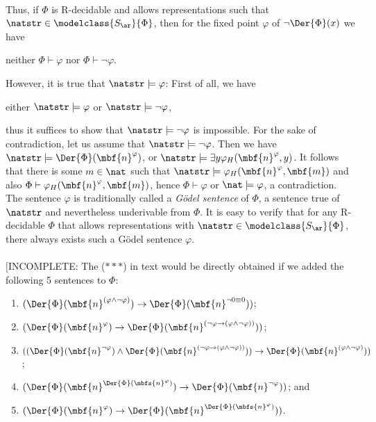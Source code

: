 \begin{enumerate}[1.]
\ \\
Thus, if $\Phi$ is R-decidable and allows representations such that $\natstr \in \modelclass{S_\ar}{\Phi}$, then for the fixed point $\varphi$ of $\neg\Der{\Phi}(x)$ we have
\begin{center}
neither $\Phi \vdash \varphi$ nor $\Phi \vdash \neg\varphi$.
\end{center}
However, it is true that $\natstr \models \varphi$: First of all, we have
\begin{center}
either $\natstr \models \varphi$ or $\natstr \models \neg\varphi$,
\end{center}
thus it suffices to show that $\natstr \models \neg\varphi$ is impossible. For the sake of contradiction, let us assume that $\natstr \models \neg\varphi$. Then we have $\natstr \models \Der{\Phi}(\mbf{n}^\varphi)$, or $\natstr \models \exists y \varphi_H(\mbf{n}^\varphi, y)$. It follows that there is some $m \in \nat$ such that $\natstr \models \varphi_H(\mbf{n}^\varphi, \mbf{m})$ and also $\Phi \vdash \varphi_H(\mbf{n}^\varphi, \mbf{m})$, hence $\Phi \vdash \varphi$ or $\nat \models \varphi$, a contradiction. The sentence $\varphi$ is traditionally called a \emph{G\"{o}del sentence} of $\Phi$, a sentence true of $\natstr$ and nevertheless underivable from $\Phi$. It is easy to verify that for any R-decidable $\Phi$ that allows representations with $\natstr \in \modelclass{S_\ar}{\Phi}$, there always exists such a G\"{o}del sentence $\varphi$.\\
\ \\
$[$INCOMPLETE: The ($***$) in text would be directly obtained if we added the following 5 sentences to $\Phi$:
\begin{enumerate}[(1)]
\item $(\Der{\Phi}(\mbf{n}^{(\varphi \land \neg\varphi)}) \rightarrow \Der{\Phi}(\mbf{n}^{\neg 0 \equiv 0}))$;
\item $(\Der{\Phi}(\mbf{n}^\varphi) \rightarrow \Der{\Phi}(\mbf{n}^{(\neg\varphi \rightarrow (\varphi \land \neg\varphi))}))$;
\item $((\Der{\Phi}(\mbf{n}^{\neg\varphi}) \land \Der{\Phi}(\mbf{n}^{(\neg\varphi \rightarrow (\varphi \land \neg\varphi))})) \rightarrow \Der{\Phi}(\mbf{n}^{(\varphi \land \neg\varphi)}))$;
\item $(\Der{\Phi}(\mbf{n}^{\Der{\Phi}(\mbfs{n}^\varphi)}) \rightarrow \Der{\Phi}(\mbf{n}^{\neg\varphi}))$; and
\item $(\Der{\Phi}(\mbf{n}^\varphi) \rightarrow \Der{\Phi}(\mbf{n}^{\Der{\Phi}(\mbfs{n}^\varphi)}))$.

\end{enumerate}
\end{enumerate}
